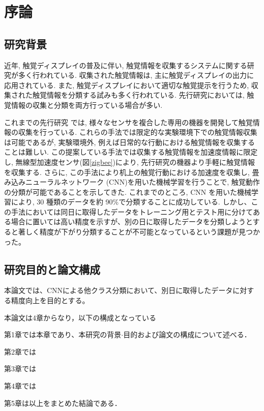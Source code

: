 ﻿

\chapter{序論} \label{sec:intro}
\section{研究背景}
近年, 触覚ディスプレイの普及に伴い, 触覚情報を収集するシステムに関する研究が多く行われている\cite{c3_}. 収集された触覚情報は, 主に触覚ディスプレイの出力に応用されている. 
また, 触覚ディスプレイにおいて適切な触覚提示を行うため, 収集された触覚情報を分類する試みも多く行われている. 先行研究においては, 触覚情報の収集と分類を両方行っている場合が多い. 

これまでの先行研究 \cite{c1} \cite{c2} では, 様々なセンサを複合した専用の機器を開発して触覚情報の収集を行っている. これらの手法では限定的な実験環境下での触覚情報収集は可能であるが, 実験環境外, 例えば日常的な行動における触覚情報を収集することは難しい.  
この提案している手法では収集する触覚情報を加速度情報に限定し, 無線型加速度センサ\cite{c5}(図\ref{zigbee})により, 先行研究の機器より手軽に触覚情報を収集する. 
さらに, この手法により机上の触覚行動における加速度を収集し, 畳み込みニューラルネットワーク (CNN)を用いた機械学習を行うことで, 触覚動作の分類が可能であることを示してきた. これまでのところ, CNN を用いた機械学習により, 30 種類のデータを約 90\%で分類することに成功している. 
しかし、この手法においては同日に取得したデータをトレーニング用とテスト用に分けてある場合に置いては高い精度を示すが、別の日に取得したデータを分類しようとすると著しく精度が下がり分類することが不可能となっているという課題が見つかった。


\section{研究目的と論文構成}
本論文では、CNNによる他クラス分類において、別日に取得したデータに対する精度向上を目的とする。



本論文は4章からなり，以下の構成となっている

第1章では本章であり、本研究の背景$\cdot$目的および論文の構成について述べる．

第2章では

第3章では

第4章では

第5章は以上をまとめた結論である．
